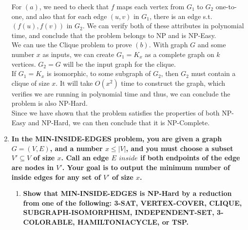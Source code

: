 \documentclass{article}
\begin{document}
\begin{enumerate}
For $(a)$, we need to check that $f$ maps each vertex from $G_1$ to $G_2$ one-to-one, and also that for each edge $(u,v)$ in $G_1$, there is an edge s.t. $(f(u), f(v))$ in $G_2$. We can verify both of these attributes in polynomial time, and conclude that the problem belongs to NP and is NP-Easy. \\
\newline 
We can use the Clique problem to prove $(b)$. With graph $G$ and some number $x$ as inputs, we can create $G_1 = K_x$ as a complete graph on $k$ vertices. $G_2 = G$ will be the input graph for the clique. \\
\newline 
If $G_1 = K_x$ is isomorphic, to some subgraph of $G_2$, then $G_2$ must contain a clique of size $x$. It will take $O(x^2)$ time to construct the graph, which verifies we are running in polynomial time and thus, we can conclude the problem is also NP-Hard. \\
\newline 
Since we have shown that the problem satisfies the properties of both NP-Easy and NP-Hard, we can then conclude that it is NP-Complete. \\











\item \textbf{In the MIN-INSIDE-EDGES problem, you are given a graph $G = (V,E)$, and a number $x \leq |V|$, and you must choose a subset $V' \subseteq V$ of size $x$. Call an edge $E$ $inside$ if both endpoints of the edge are nodes in $V'$. Your goal is to output the minimum number of inside edges for any set of $V'$ of size $x$.}

\begin{enumerate}
\item \textbf{Show that MIN-INSIDE-EDGES is NP-Hard by a reduction from one of the following: 3-SAT, VERTEX-COVER, CLIQUE, SUBGRAPH-ISOMORPHISM, INDEPENDENT-SET, 3-COLORABLE, HAMILTONIACYCLE, or TSP.} 










\end{enumerate}
\end{enumerate}
\end{document}
